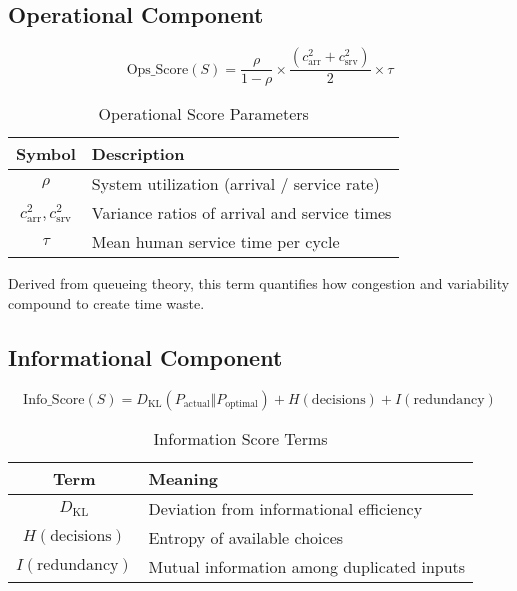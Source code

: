 \subsection{Operational Component}
\label{sec:operational-component}

\begin{equation}
\label{eq:ops-score}
\text{Ops\_Score}(S) = \frac{\rho}{1-\rho} \times \frac{(c_{\text{arr}}^2 + c_{\text{srv}}^2)}{2} \times \tau
\end{equation}

\begin{table}[h]
\centering
\caption{Operational Score Parameters}
\label{tab:ops-params}
\begin{tabular}{cl}
\toprule
\textbf{Symbol} & \textbf{Description} \\
\midrule
$\rho$ & System utilization (arrival / service rate) \\
$c_{\text{arr}}^2, c_{\text{srv}}^2$ & Variance ratios of arrival and service times \\
$\tau$ & Mean human service time per cycle \\
\bottomrule
\end{tabular}
\end{table}

Derived from queueing theory, this term quantifies how congestion and variability compound to create time waste.

\subsection{Informational Component}
\label{sec:informational-component}

\begin{equation}
\label{eq:info-score}
\text{Info\_Score}(S) = D_{\text{KL}}(P_{\text{actual}} \Vert P_{\text{optimal}}) + H(\text{decisions}) + I(\text{redundancy})
\end{equation}

\begin{table}[h]
\centering
\caption{Information Score Terms}
\label{tab:info-terms}
\begin{tabular}{cl}
\toprule
\textbf{Term} & \textbf{Meaning} \\
\midrule
$D_{\text{KL}}$ & Deviation from informational efficiency \\
$H(\text{decisions})$ & Entropy of available choices \\
$I(\text{redundancy})$ & Mutual information among duplicated inputs \\
\bottomrule
\end{tabular}
\end{table}

